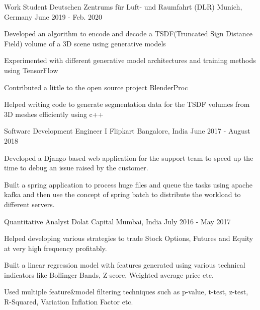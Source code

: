 
\begin{cventries}
  \cventry
    {Work Student} %
    {Deutschen Zentrums für Luft- und Raumfahrt (DLR)} %
    {Munich, Germany} %
    {June 2019 - Feb. 2020} %
    {
      \begin{cvitems} %
        \item {Developed an algorithm to encode and decode a TSDF(Truncated Sign Distance Field) volume of a 3D scene using generative models}
        \item {Experimented with different generative model architectures and training methods using TensorFlow}
        \item {Contributed a little to the open source project BlenderProc}
        \item {Helped writing code to generate segmentation data for the TSDF volumes from 3D meshes efficiently using c++}
      \end{cvitems}
    }

  \cventry
    {Software Development Engineer I} %
    {Flipkart} %
    {Bangalore, India} %
    {June 2017 - August 2018} %
    {
      \begin{cvitems} %
        \item {Developed a Django based web application for the support team to speed up the time to debug an issue raised by the customer.}
        \item {Built a spring application to process huge files and queue the tasks using apache kafka and then use the concept of spring batch to distribute the workload to different servers.}
      \end{cvitems}
    }

  \cventry
    {Quantitative Analyst} %
    {Dolat Capital} %
    {Mumbai, India} %
    {July 2016 - May 2017} %
    {
      \begin{cvitems} %
        \item {Helped developing various strategies to trade Stock Options, Futures and Equity at very high frequency profitably.}
        \item {Built a linear regression model with features generated using various technical indicators like Bollinger Bands, Z-score, Weighted average price etc.}
        \item {Used multiple feature\&model filtering techniques such as p-value, t-test, z-test, R-Squared, Variation Inflation Factor etc.}
      \end{cvitems}
    }


\end{cventries}
